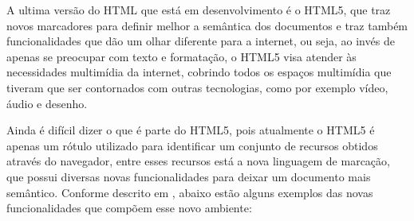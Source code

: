 A ultima versão do HTML que está em desenvolvimento é o HTML5, que
traz novos marcadores para definir melhor a semântica dos documentos e
traz também funcionalidades que dão um olhar diferente para a internet,
ou seja, ao invés de apenas se preocupar com texto e formatação, o HTML5
visa atender às necessidades multimídia da internet, cobrindo todos os
espaços multimídia que tiveram que ser contornados com outras tecnologias,
como por exemplo vídeo, áudio e desenho.

Ainda é difícil dizer o que é parte do HTML5, pois atualmente o HTML5
é apenas um rótulo utilizado para identificar um conjunto de recursos
obtidos através do navegador, entre esses recursos está a nova
linguagem de marcação, que possui diversas novas funcionalidades para
deixar um documento mais semântico.
Conforme descrito em , abaixo estão alguns
exemplos das novas funcionalidades que compõem esse novo ambiente:

